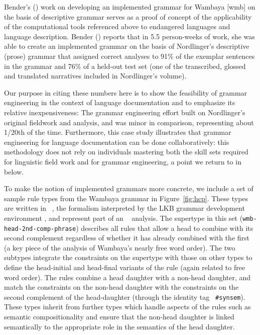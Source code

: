 Bender's (\citeyear{Bender:08a,Bender:10}) work on developing an
implemented grammar for Wambaya [wmb] on the basis of
 descriptive grammar serves as a proof of
concept of the applicability of the computational tools referenced
above to endangered languages and language
description. Bender (\citeyear{Bender:08a}) reports that in 5.5 person-weeks of
work, she was able to create an implemented grammar on the basis of
Nordlinger's descriptive (prose) grammar that assigned correct
analyses to 91\% of the exemplar sentences in the grammar and 76\% of
a held-out test set (one of the transcribed, glossed and translated
narratives included in Nordlinger's volume).

Our purpose in citing these numbers here is to show the feasibility of
grammar engineering in the context of language documentation and to
emphasize its relative inexpensiveness: The grammar engineering effort
built on Nordlinger's original fieldwork and analysis, and was minor
in comparison, representing about 1/20th of the time.  Furthermore,
this case study illustrates that grammar engineering for language
documentation can be done collaboratively: this methodology does not
rely on individuals mastering both the skill sets required for
linguistic field work and for grammar engineering, a point we return
to in  below.

To make the notion of implemented grammars more concrete, we include a
set of sample rule types from the Wambaya grammar in
Figure~\ref{fig:hcp}.  These types are written in
\tdl\ \citep{Copestake:00}, the formalism interpreted by the LKB
grammar development environment \citep{Copestake:02}, and represent
part of an \hpsg\ \citep{Pol:Sag:94} analysis.  The supertype in this
set ({\tt\small  wmb-head-2nd-comp-phrase}) describes all rules that allow a
head to combine with its second complement regardless of whether it has already
combined with the
first (a key piece of the analysis of Wambaya's nearly free word
order).  The two subtypes integrate the constraints on the supertype
with those on other types to define the head-initial and head-final
variants of the rule (again related to free word order).  The rules
combine a head daughter with a non-head daughter, and match the
constraints on the non-head daughter with the constraints on the
second complement of the head-daughter (through the identity tag {\tt\small 
  \#synsem}). These types inherit from further types which handle
aspects of the rules such as semantic compositionality and ensure that the
non-head daughter is linked semantically to the appropriate role
in the semantics of the head daughter.

